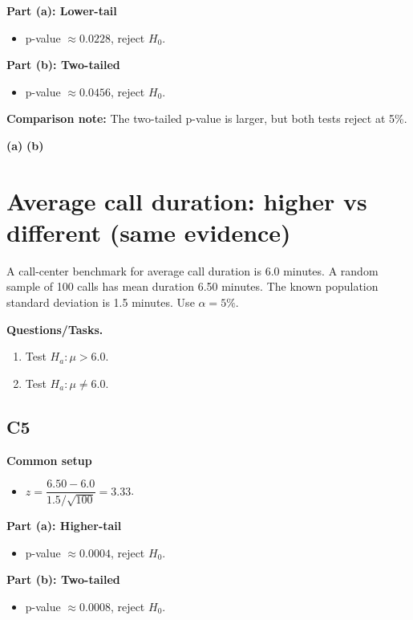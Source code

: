 \textbf{Part (a): Lower-tail}
\begin{itemize}
    \item p-value \(\approx0.0228\), reject \(H_0\).
\end{itemize}

\textbf{Part (b): Two-tailed}
\begin{itemize}
    \item p-value \(\approx0.0456\), reject \(H_0\).
\end{itemize}

\textbf{Comparison note:} The two-tailed p-value is larger, but both tests reject at 5\%.

\begin{center}
\textbf{(a)}\;
\hspace{0.8cm}
\textbf{(b)}\;
\end{center}

\section{Average call duration: higher vs different (same evidence)}
A call-center benchmark for average call duration is 6.0 minutes. A random sample of 100 calls has mean duration 6.50 minutes. The known population standard deviation is 1.5 minutes. Use \(\alpha=5\%\).

\textbf{Questions/Tasks.}
\begin{enumerate}
    \item[(a)] Test \(H_a\colon \mu>6.0\).
    \item[(b)] Test \(H_a\colon \mu\ne6.0\).
\end{enumerate}

\subsection*{C5}
\textbf{Common setup}
\begin{itemize}
    \item \(z=\dfrac{6.50-6.0}{1.5/\sqrt{100}}=3.33\).
\end{itemize}

\textbf{Part (a): Higher-tail}
\begin{itemize}
    \item p-value \(\approx0.0004\), reject \(H_0\).
\end{itemize}

\textbf{Part (b): Two-tailed}
\begin{itemize}
    \item p-value \(\approx0.0008\), reject \(H_0\).
\end{itemize}

